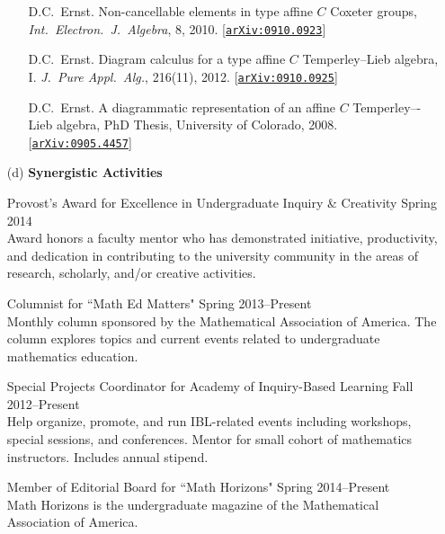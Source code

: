 \documentclass[11pt]{article}
\begin{document}
\begin{enumerate}[leftmargin=*]
\begin{enumerate}[leftmargin=\parindent]
\vspace{.25em}

\noindent D.C.~Ernst.  Non-cancellable elements in type affine $C$ Coxeter groups,  \emph{Int.~Electron.~J.~Algebra}, 8, 2010.  [\href{http://arxiv.org/abs/0910.0923}{\texttt{arXiv:0910.0923}}]

\vspace{.25em}

D.C.~Ernst.  Diagram calculus for a type affine $C$ Temperley--Lieb algebra, I. \emph{J.~Pure Appl.~Alg.}, 216(11), 2012. [\href{http://arxiv.org/abs/0910.0925}{\texttt{arXiv:0910.0925}}]

\vspace{.25em}

D.C.~Ernst. A diagrammatic representation of an affine $C$ Temperley–-Lieb algebra, PhD Thesis, University of Colorado, 2008. [\href{http://arxiv.org/abs/0905.4457}{\texttt{arXiv:0905.4457}}]

\end{enumerate}
 
\item[(d)] \textbf{Synergistic Activities}

Provost’s Award for Excellence in Undergraduate Inquiry \& Creativity \hfill Spring 2014\\
Award honors a faculty mentor who has demonstrated initiative, productivity, and dedication in contributing to the university community in the areas of research, scholarly, and/or creative activities.

\vspace{.25em}

Columnist for ``Math Ed Matters" \hfill Spring 2013--Present\\
Monthly column sponsored by the Mathematical Association of America. The column explores topics and current events related to undergraduate mathematics education. 

\vspace{.25em}

Special Projects Coordinator for Academy of Inquiry-Based Learning \hfill Fall 2012--Present\\
Help organize, promote, and run IBL-related events including workshops, special sessions, and conferences. Mentor for small cohort of mathematics instructors.  Includes annual stipend.

\vspace{.25em}

Member of Editorial Board for ``Math Horizons" \hfill Spring 2014--Present\\
Math Horizons is the undergraduate magazine of the Mathematical Association of America.


\end{enumerate}
\end{document}
